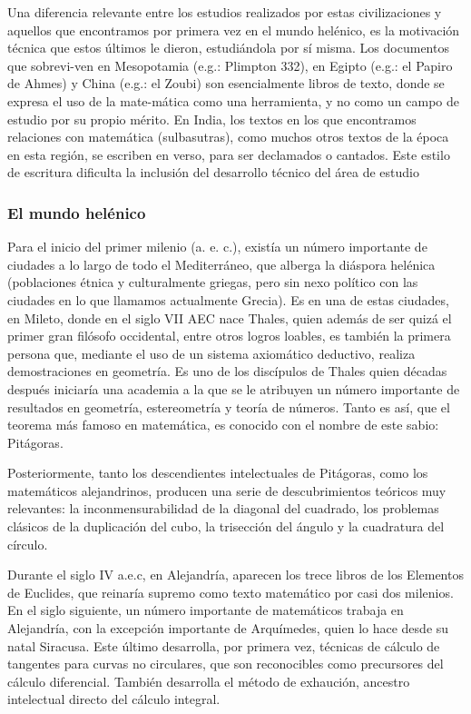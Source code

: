 Una diferencia relevante entre los estudios realizados por estas civilizaciones y aquellos que encontramos por primera vez en el mundo helénico, es la motivación técnica que estos últimos le dieron, estudiándola por sí misma. Los documentos que sobrevi-ven en Mesopotamia (e.g.: Plimpton 332), en Egipto (e.g.: el Papiro de Ahmes) y China (e.g.: el Zoubi) son esencialmente libros de texto, donde se expresa el uso de la mate-mática como una herramienta, y no como un campo de estudio por su propio mérito. En India, los textos en los que encontramos relaciones con matemática (sulbasutras), como muchos otros textos de la época en esta región, se escriben en verso, para ser declamados o cantados. Este estilo de escritura dificulta la inclusión del desarrollo técnico del área de estudio

\subsubsection*{El mundo helénico}

Para el inicio del primer milenio (a. e. c.), existía un número importante de ciudades a lo largo de todo el Mediterráneo, que alberga la diáspora helénica (poblaciones étnica y culturalmente griegas, pero sin nexo político con las ciudades en lo que llamamos actualmente Grecia). Es en una de estas ciudades, en Mileto, donde en el siglo VII AEC nace Thales, quien además de ser quizá el primer gran filósofo occidental, entre otros logros loables, es también la primera persona que, mediante el uso de un sistema axiomático deductivo, realiza demostraciones en geometría. 
Es uno de los discípulos de Thales quien décadas después iniciaría una academia a la que se le atribuyen un número importante de resultados en geometría, estereometría y teoría de números. Tanto es así, que el teorema más famoso en matemática, es conocido con el nombre de este sabio: Pitágoras.

Posteriormente, tanto los descendientes intelectuales de Pitágoras, como los matemáticos alejandrinos, producen una serie de descubrimientos teóricos muy relevantes: la inconmensurabilidad de la diagonal del cuadrado, los problemas clásicos de la duplicación del cubo, la trisección del ángulo y la cuadratura del círculo.

Durante el siglo IV a.e.c, en Alejandría, aparecen los trece libros de los Elementos de Euclides, que reinaría supremo como texto matemático por casi dos milenios. En el siglo siguiente, un número importante de matemáticos trabaja en Alejandría, con la excepción importante de Arquímedes, quien lo hace desde su natal Siracusa. Este último desarrolla, por primera vez, técnicas de cálculo de tangentes para curvas no circulares, que son reconocibles como precursores del cálculo diferencial. También desarrolla el método de exhaución, ancestro intelectual directo del cálculo integral.

